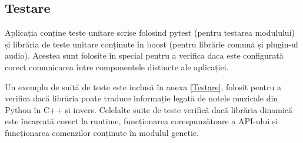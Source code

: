     \subsection{Testare}
        \noindent Aplicația conține teste unitare scrise folosind pytest (pentru testarea modulului) și librăria de teste unitare conținute în boost (pentru librărie comună și plugin-ul audio). Acestea sunt folosite în special pentru a verifica daca este configurată corect comunicarea între componentele distincte ale aplicației. 
        \par Un exemplu de suită de teste este inclusă în anexa \ref{Testare}, folosit pentru a verifica dacă librăria poate traduce informație legată de notele muzicale din Python în C++ și invers. Celelalte suite de teste verifică dacă librăria dinamică este încarcată corect la runtime, funcționarea corespunzătoare a API-ului și funcționarea comenzilor conținute în modulul genetic.
 
